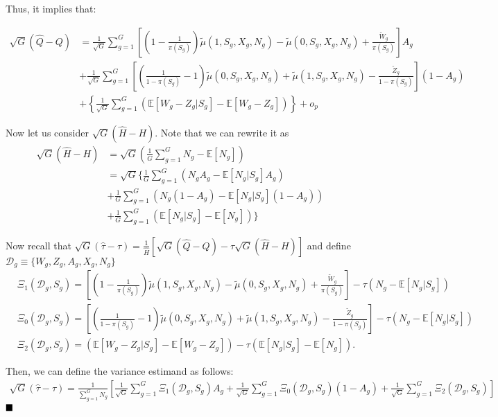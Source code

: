 \documentclass{article}
\renewcommand{\qed}{\hfill\blacksquare}
\begin{document}
 Thus, it implies that:
 
 \begin{align}
 \sqrt{G}(\hat{Q} - Q)&= \frac{1}{\sqrt{G}} \sum_{g=1}^{G} \left[ \left(1 - \frac{1}{\pi(S_g)}\right)\tilde{\mu}(1, S_g, X_g, N_g) - \tilde{\mu}(0, S_g, X_g, N_g) + \frac{\tilde{W}_g}{\pi(S_g)} \right]A_g \nonumber \\
 &+ \frac{1}{\sqrt{G}} \sum_{g=1}^{G} \left[ \left(\frac{1}{1-\pi(S_g)} -1\right)\tilde{\mu}(0, S_g, X_g, N_g) + \tilde{\mu}(1, S_g, X_g, N_g) - \frac{\tilde{Z}_g}{1-\pi(S_g)} \right](1-A_g) \nonumber \\
 &+ \left\{\frac{1}{\sqrt{G}} \sum_{g=1}^{G} \left( \mathbb E [W_g - Z_g|S_g] - \mathbb E[W_g - Z_g] \right) \right\} + o_p \nonumber
 \end{align}

 Now let us consider $\sqrt{G}(\hat{H} - H)$. Note that we can rewrite it as
 \begin{align}
 	\sqrt{G}(\hat{H} - H)&=\sqrt{G}\left(\frac{1}{G} \sum_{g=1}^{G} N_g -\mathbb E[N_g]\right) \nonumber \\
 	&= \sqrt{G} \Bigg\{ \frac{1}{G} \sum_{g=1}^G ( N_g A_g - \mathbb E[N_g|S_g]A_g) \nonumber \\ 
 	& + \frac{1}{G} \sum_{g=1}^{G} (N_g(1-A_g) - \mathbb E[N_g|S_g] (1 - A_g)) \nonumber \\
 	& + \frac{1}{G} \sum_{g=1}^G (\mathbb E [N_g|S_g] - \mathbb E[N_g]) \Bigg\} \nonumber
 \end{align}
 
 Now recall that $\sqrt{G}(\hat{\tau} - \tau) = \frac{1}{\hat{H}} \left[\sqrt{G}(\hat{Q} - Q)- \tau \sqrt{G}(\hat{H} - H)\right]$ and define $\mathcal D_g \equiv \{W_g,Z_g,A_g,X_g, N_g\}$
 \begin{align}
 	&\Xi_1(\mathcal D_g,S_g) = \left[ \left(1 - \frac{1}{\pi(S_g)}\right) \tilde{\mu}(1,S_g,X_g,N_g) - \tilde{\mu}(0,S_g,X_g,N_g) + \frac{\tilde{W}_g}{\pi(S_g)}\right] - \tau (N_g - \mathbb E[N_g|S_g]) \nonumber \\
 	&\Xi_0(\mathcal D_g,S_g) = \left[ \left(\frac{1}{1-\pi(S_g)} - 1\right) \tilde{\mu}(0,S_g,X_g,N_g) + \tilde{\mu}(1,S_g,X_g,N_g) - \frac{\tilde{Z}_g}{1-\pi(S_g)}\right] - \tau (N_g - \mathbb E[N_g|S_g]) \nonumber \\
 	&\Xi_2(\mathcal D_g,S_g) = \left( \mathbb E[W_g - Z_g |S_g] - \mathbb E[W_g - Z_g] \right) - \tau (\mathbb E[N_g|S_g] - \mathbb E[N_g]) \nonumber .
 \end{align}
 
 Then, we can define the variance estimand as follows:
 \begin{align}
 \sqrt{G}(\hat{\tau} - \tau) = \frac{1}{\sum_{g=1}^G N_g} \left[ \frac{1}{\sqrt{G}} \sum_{g=1}^G \Xi_1(\mathcal D_g,S_g) A_g + \frac{1}{\sqrt{G}} \sum_{g=1}^G \Xi_0(\mathcal D_g, S_g) (1 - A_g) + \frac{1}{\sqrt{G}} \sum_{g=1}^G \Xi_2(\mathcal D_g, S_g) \right] \nonumber	
 \end{align}
\hfill $\qed$
\end{document}
